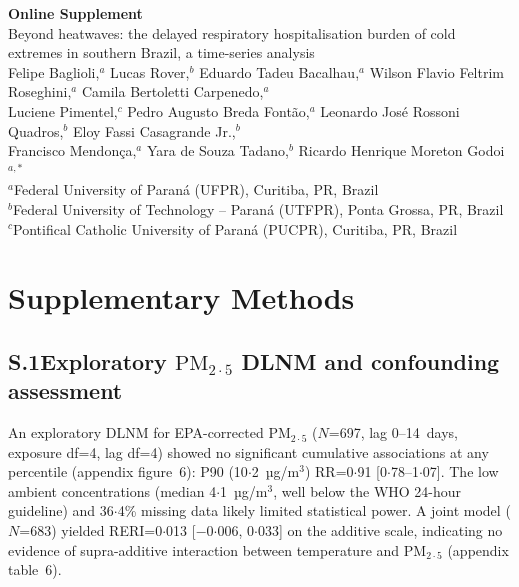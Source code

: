 \documentclass[12pt]{article}
\begin{document}
\begin{center}
{\Large\bfseries Online Supplement}\\[0.5em]
{\large Beyond heatwaves: the delayed respiratory hospitalisation burden
of cold extremes in southern Brazil, a time-series analysis}\\[0.5em]
Felipe Baglioli,$^{a}$ Lucas Rover,$^{b}$ Eduardo Tadeu Bacalhau,$^{a}$
Wilson Flavio Feltrim Roseghini,$^{a}$ Camila Bertoletti Carpenedo,$^{a}$\\
Luciene Pimentel,$^{c}$ Pedro Augusto Breda Font\~{a}o,$^{a}$
Leonardo Jos\'{e} Rossoni Quadros,$^{b}$ Eloy Fassi Casagrande Jr.,$^{b}$\\
Francisco Mendon\c{c}a,$^{a}$ Yara de Souza Tadano,$^{b}$ Ricardo Henrique Moreton Godoi$^{a,*}$\\[0.3em]
{\small $^{a}$Federal University of Paran\'{a} (UFPR), Curitiba, PR, Brazil}\\
{\small $^{b}$Federal University of Technology -- Paran\'{a} (UTFPR), Ponta Grossa, PR, Brazil}\\
{\small $^{c}$Pontifical Catholic University of Paran\'{a} (PUCPR), Curitiba, PR, Brazil}
\end{center}

\bigskip

\section*{Supplementary Methods}

\subsection*{S.1\quad Exploratory $\text{PM}_{2{\cdot}5}$ DLNM and confounding assessment}

An exploratory DLNM for EPA-corrected $\text{PM}_{2{\cdot}5}$ ($N$=697,
lag 0--14~days, exposure df=4, lag df=4) showed no significant
cumulative associations at any percentile (appendix figure~6): P90
(10${\cdot}$2~µg/m$^3$) RR=0${\cdot}$91 [0${\cdot}$78--1${\cdot}$07].
The low ambient concentrations (median 4${\cdot}$1~µg/m$^3$, well
below the WHO 24-hour guideline) and 36${\cdot}$4\% missing data
likely limited statistical power. A joint model ($N$=683) yielded
RERI=0${\cdot}$013 [$-$0${\cdot}$006, 0${\cdot}$033] on the additive
scale, indicating no evidence of supra-additive interaction between
temperature and $\text{PM}_{2{\cdot}5}$ (appendix table~6).
\end{document}
